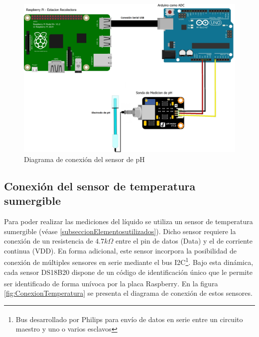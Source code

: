         \begin{figure}[h]
            \centering
            \includegraphics[scale=0.25]{hardware/DiagramaSensordepH_bb2.jpg}
            \caption{Diagrama de conexión del sensor de pH}
            \label{fig:ConexionSensorpH}
        \end{figure}

    \subsection{Conexión del sensor de temperatura sumergible}

        \par Para poder realizar las mediciones del líquido se utiliza un sensor de temperatura sumergible (véase \ref{subseccionElementosutilizados}). Dicho sensor requiere la conexión de un resistencia de $4.7k\Omega$ entre el pin de datos (Data) y el de corriente continua (VDD). En forma adicional, este sensor incorpora la posibilidad de conexión de múltiples sensores en serie mediante el bus I2C\footnote{Bus desarrollado por Philips\textsuperscript{\textregistered} para envío de datos en serie entre un circuito maestro y uno o varios esclavos}. Bajo esta dinámica, cada sensor DS18B20 dispone de un código de identificación único que le permite ser identificado de forma unívoca por la placa Raspberry\textsuperscript{\textregistered}. En la figura \ref{fig:ConexionTemperatura} se presenta el diagrama de conexión de estos sensores.
        
